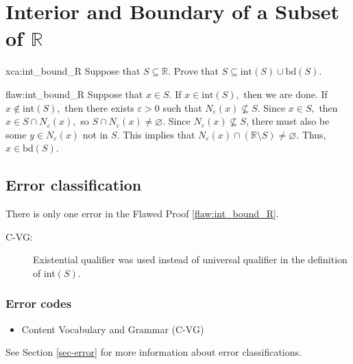 \section{Interior and Boundary of a Subset of $\mathbb{R}$}

\begin{xca}{xca:int_bound_R}
Suppose that $S \subseteq \mathbb{R}.$ Prove that $S \subseteq \text{int}(S) \cup \text{bd}(S).$
\end{xca}

\begin{flaw}{flaw:int_bound_R} %
Suppose that $x \in S.$ If $x \in \text{int}(S),$ then we are done. If $x \notin \text{int}(S),$ then there exists $\varepsilon > 0$ such that $N_{\varepsilon}(x) \not\subseteq S.$ Since $x \in S,$ then $x \in S \cap N_{\varepsilon}(x),$ so $S \cap N_{\varepsilon}(x) \neq \varnothing.$ Since $ N_{\varepsilon}(x) \not\subseteq S$, there must also be some $y \in N_{\varepsilon}(x)$ not in $S.$ This implies that $N_{\varepsilon}(x) \cap (\mathbb{R} \setminus S) \neq \varnothing.$ Thus, $x \in \text{bd}(S)$.
\end{flaw}

\clearpage
\subsection{Error classification}


There %
is only one error %
 in the Flawed Proof \ref{flaw:int_bound_R}. %


 \begin{description}
 	\item[C-VG:] Existential qualifier was used instead of universal qualifier in the definition of int$(S)$.	
 \end{description}


\subsubsection{Error codes}
\begin{itemize}
	\item 	Content Vocabulary and Grammar (C-VG)
\end{itemize}
See Section \ref{sec-error} for more information about error classifications.

